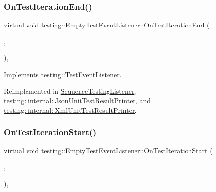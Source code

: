 \subsubsection{\texorpdfstring{OnTestIterationEnd()}{OnTestIterationEnd()}}
{\footnotesize\ttfamily virtual void testing\+::\+Empty\+Test\+Event\+Listener\+::\+On\+Test\+Iteration\+End (\begin{DoxyParamCaption}\item[{const \mbox{\hyperlink{classtesting_1_1UnitTest}{Unit\+Test}} \&}]{,  }\item[{int}]{ }\end{DoxyParamCaption})\hspace{0.3cm}{\ttfamily [inline]}, {\ttfamily [virtual]}}



Implements \mbox{\hyperlink{classtesting_1_1TestEventListener_a550fdb3e55726e4cefa09f5697941425}{testing\+::\+Test\+Event\+Listener}}.



Reimplemented in \mbox{\hyperlink{classSequenceTestingListener_a783bc01e2a95f5bf73bbde4d96832e0f}{Sequence\+Testing\+Listener}}, \mbox{\hyperlink{classtesting_1_1internal_1_1JsonUnitTestResultPrinter_a44edb54cf1ab8cdcd56bda5058b8f1d6}{testing\+::internal\+::\+Json\+Unit\+Test\+Result\+Printer}}, and \mbox{\hyperlink{classtesting_1_1internal_1_1XmlUnitTestResultPrinter_a2ae986dd2f4f2aed31cc6f3bc8c56898}{testing\+::internal\+::\+Xml\+Unit\+Test\+Result\+Printer}}.

\mbox{\label{classtesting_1_1EmptyTestEventListener_a836f05829855dc60d13ba99ad712c0dd}} 
\subsubsection{\texorpdfstring{OnTestIterationStart()}{OnTestIterationStart()}}
{\footnotesize\ttfamily virtual void testing\+::\+Empty\+Test\+Event\+Listener\+::\+On\+Test\+Iteration\+Start (\begin{DoxyParamCaption}\item[{const \mbox{\hyperlink{classtesting_1_1UnitTest}{Unit\+Test}} \&}]{,  }\item[{int}]{ }\end{DoxyParamCaption})\hspace{0.3cm}{\ttfamily [inline]}, {\ttfamily [virtual]}}



